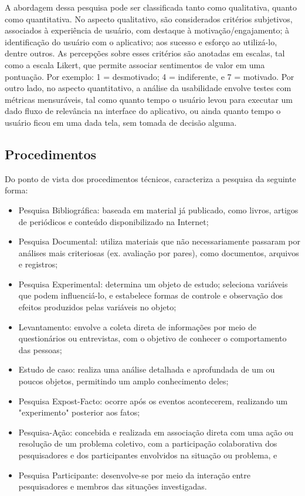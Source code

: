 A abordagem dessa pesquisa pode ser classificada tanto como qualitativa, quanto como quantitativa. No aspecto qualitativo, são considerados critérios subjetivos, associados à experiência de usuário, com destaque à motivação/engajamento; à identificação 
do usuário com o aplicativo; aos sucesso e esforço ao utilizá-lo, dentre outros. As percepções sobre esses critérios são anotadas em escalas, tal como a escala Likert, que permite associar sentimentos de valor em uma pontuação. Por exemplo: 1 = desmotivado; 
4 = indiferente, e 7 = motivado. Por outro lado, no aspecto quantitativo, a análise da usabilidade envolve testes com métricas mensuráveis, tal como quanto tempo o usuário levou para executar um dado fluxo de relevância na interface do aplicativo, ou ainda 
quanto tempo o usuário ficou em uma dada tela, sem tomada de decisão alguma.

\subsection{Procedimentos}
\label{sec:Procedimentos}
Do ponto de vista dos procedimentos técnicos,  caracteriza a pesquisa da seguinte forma:

\begin{itemize}
	\item Pesquisa Bibliográfica: baseada em material já publicado, como livros, artigos de periódicos e conteúdo disponibilizado na Internet;
	\item Pesquisa Documental: utiliza materiais que não necessariamente passaram por análises mais criteriosas (ex. avaliação por pares), como documentos, arquivos e registros;
	\item Pesquisa Experimental: determina um objeto de estudo; seleciona variáveis que podem influenciá-lo, e estabelece formas de controle e observação dos efeitos produzidos pelas variáveis no objeto;
	\item Levantamento: envolve a coleta direta de informações por meio de questionários ou entrevistas, com o objetivo de conhecer o comportamento das pessoas;
	\item Estudo de caso: realiza uma análise detalhada e aprofundada de um ou poucos objetos, permitindo um amplo conhecimento deles;
	\item Pesquisa Expost-Facto: ocorre após os eventos acontecerem, realizando um "experimento" posterior aos fatos;
	\item Pesquisa-Ação: concebida e realizada em associação direta com uma ação ou resolução de um problema coletivo, com a participação colaborativa dos pesquisadores e dos participantes envolvidos na situação ou problema, e
	\item Pesquisa Participante: desenvolve-se por meio da interação entre pesquisadores e membros das situações investigadas.
\end{itemize}

